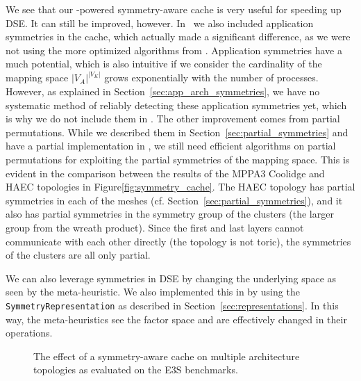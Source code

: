 We see that our \mpsym-powered symmetry-aware cache is very useful for speeding up \ac{DSE}.
It can still be improved, however.
In~\cite{goens_taco17} we also included application symmetries in the cache, which actually made a significant difference, as we were not using the more optimized algorithms from \mpsym.
Application symmetries have a much potential, which is also intuitive if we consider the cardinality of the mapping space $|V_A|^{|V_K|}$ grows exponentially with the number of processes.
However, as explained in Section~\ref{sec:app_arch_symmetries}, we have no systematic method of reliably detecting these application symmetries yet, which is why we do not include them in \mocasin.
The other improvement comes from partial permutations. While we described them in Section~\ref{sec:partial_symmetries} and have a partial implementation in \mpsym, we still need efficient algorithms on partial permutations for exploiting the partial symmetries of the mapping space.
This is evident in the comparison between the results of the MPPA3 Coolidge and \ac{HAEC} topologies in Figure\ref{fig:symmetry_cache}.
The \ac{HAEC} topology has partial symmetries in each of the meshes (cf. Section~\ref{sec:partial_symmetries}), and it also has partial symmetries in the symmetry group of the clusters (the larger group from the wreath product).
Since the first and last layers cannot communicate with each other directly (the topology is not toric), the symmetries of the clusters are all only partial.

We can also leverage symmetries in \ac{DSE} by changing the underlying space as seen by the meta-heuristic.
We also implemented this in \mocasin by using the \texttt{SymmetryRepresentation} as described in Section~\ref{sec:representations}.
In this way, the meta-heuristics see the factor space and are effectively changed in their operations.

\begin{figure}[h]
	\centering
   \resizebox{0.95\textwidth}{!}{}
	\caption{The effect of a symmetry-aware cache on multiple architecture topologies as evaluated on the \ac{E3S} benchmarks.}
	\label{fig:symmetry_changed_operations}
\end{figure}


